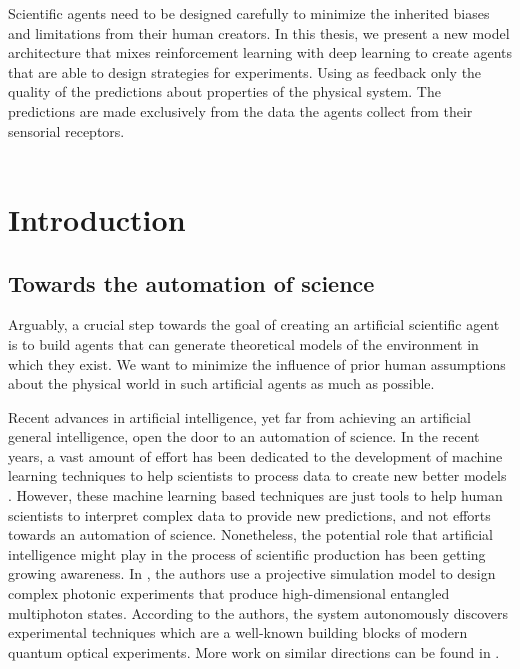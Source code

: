 \documentclass[11pt,a4paper,twoside]{report}
\newcommand{\+}{\textnormal{+} }
\theoremstyle{definition}
\numberwithin{equation}{chapter}
\begin{document}
Scientific agents need to be designed carefully to minimize the inherited biases
and limitations from their human creators. In this thesis, we present a new
model architecture that mixes reinforcement learning with deep learning to
create agents that are able to design strategies for experiments. Using as
feedback only the quality of the predictions about properties of the physical
system. The predictions are made exclusively from the data the agents collect
from their sensorial receptors. \\
\\

\vspace{12mm}


\chapter{Introduction} \label{Introduction}
\section*{Towards the automation of science}

Arguably, a crucial step towards the goal of creating an artificial scientific
agent is to build agents that can generate theoretical models of the environment
in which they exist. We want to minimize the influence of prior human
assumptions about the physical world in such artificial agents as much as
possible.


Recent advances in artificial intelligence, yet far from achieving an artificial
general intelligence, open the door to an automation of science. In the recent
years, a vast amount of effort has been dedicated to the development of machine
learning techniques to help scientists to process data to create new better
models \cite{Carleo_2019}. However, these machine learning based techniques are
just tools to help human scientists to interpret complex data to provide new
predictions, and not efforts towards an automation of science. Nonetheless, the
potential role that artificial intelligence might play in the process of
scientific production has been getting growing awareness. In
\cite{Melnikov_2018}, the authors use a projective simulation model to design
complex photonic experiments that produce high-dimensional entangled multiphoton
states. According to the authors, the system autonomously discovers experimental
techniques which are a well-known building blocks of modern quantum optical
experiments. More work on similar directions can be found in
\cite{ried2019minimal,Wu_2019,De_Simone_2019,
PhysRevD.99.015014,rahaman2019learning,nautrup2020operationally}.
\end{document}
